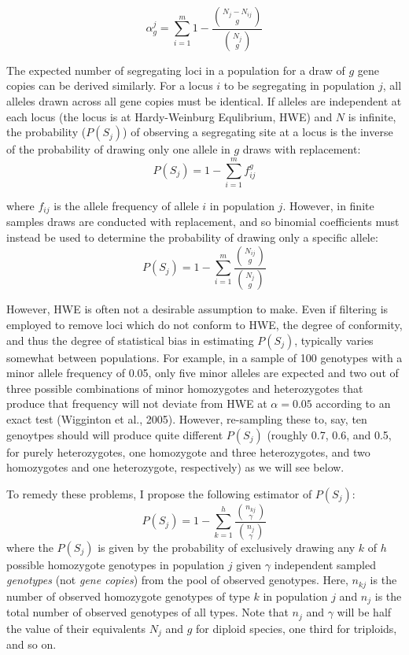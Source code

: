 \documentclass[
  12pt,
]{article}
\begin{document}
\begin{equation}
\alpha_{g}^{j} = \sum_{i = 1}^{m} 1 - \frac{\binom{N_{j} - N_{ij}}{g}}{\binom{N_{j}}{g}}
\end{equation}

The expected number of segregating loci in a population for a draw of
\(g\) gene copies can be derived similarly. For a locus \(i\) to be
segregating in population \(j\), all alleles drawn across all gene
copies must be identical. If alleles are independent at each locus (the
locus is at Hardy-Weinburg Equlibrium, HWE) and \(N\) is infinite, the
probability (\(P({S_{j}})\)) of observing a segregating site at a locus
is the inverse of the probability of drawing only one allele in \(g\)
draws with replacement: \[P({S_{j}}) = 1 - \sum_{i = 1}^{m} f_{ij}^{g}\]

where \(f_{ij}\) is the allele frequency of allele \(i\) in population
\(j\). However, in finite samples draws are conducted with replacement,
and so binomial coefficients must instead be used to determine the
probability of drawing only a specific allele:
\[P({S_{j}}) = 1 - \sum_{i = 1}^{m} \frac{\binom{N_{ij}}{g}}{\binom{N_{j}}{g}}\]

However, HWE is often not a desirable assumption to make. Even if
filtering is employed to remove loci which do not conform to HWE, the
degree of conformity, and thus the degree of statistical bias in
estimating \(P({S_{j}})\), typically varies somewhat between
populations. For example, in a sample of 100 genotypes with a minor
allele frequency of 0.05, only five minor alleles are expected and two
out of three possible combinations of minor homozygotes and
heterozygotes that produce that frequency will not deviate from HWE at
\(\alpha = 0.05\) according to an exact test (Wigginton et al., 2005).
However, re-sampling these to, say, ten genoytpes should will produce
quite different \(P(S_{j})\) (roughly 0.7, 0.6, and 0.5, for purely
heterozygotes, one homozygote and three heterozygotes, and two
homozygotes and one heterozygote, respectively) as we will see below.

To remedy these problems, I propose the following estimator of
\(P({S_{j}})\):
\[P({S_{j}}) = 1 - \sum_{k = 1}^{h}\frac{\binom{n_{kj}}{\gamma}}{\binom{n_{j}}{\gamma}}\]
where the \(P({S_{j}})\) is given by the probability of exclusively
drawing any \(k\) of \(h\) possible homozygote genotypes in population
\(j\) given \(\gamma\) independent sampled \emph{genotypes} (not
\emph{gene copies}) from the pool of observed genotypes. Here,
\(n_{kj}\) is the number of observed homozygote genotypes of type \(k\)
in population \(j\) and \(n_{j}\) is the total number of observed
genotypes of all types. Note that \(n_{j}\) and \(\gamma\) will be half
the value of their equivalents \(N_{j}\) and \(g\) for diploid species,
one third for triploids, and so on.
\end{document}
